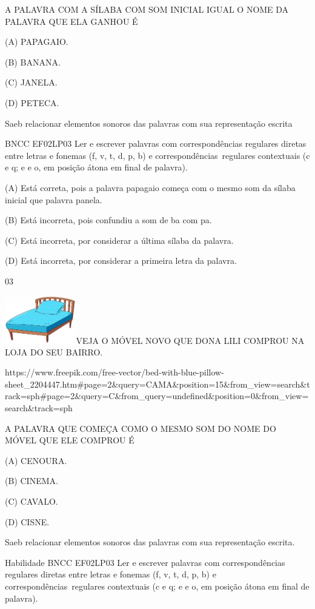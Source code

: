 {{{{{{\protect\hypertarget{_Hlk129268378}{}{}A PALAVRA COM A SÍLABA COM SOM
INICIAL IGUAL O NOME DA PALAVRA QUE ELA GANHOU É

(A) PAPAGAIO.

(B) BANANA.

(C) JANELA.

(D) PETECA.

Saeb relacionar elementos sonoros das palavras com sua representação
escrita

BNCC EF02LP03 Ler e escrever palavras com correspondências regulares
diretas entre letras e fonemas (f, v, t, d, p, b) e
correspondências~regulares contextuais (c e q; e e o, em posição átona
em final de palavra).

(A) Está correta, pois a palavra papagaio começa com o mesmo som da
sílaba inicial que palavra panela.

(B) Está incorreta, pois confundiu a som de ba com pa.

(C) Está incorreta, por considerar a última sílaba da palavra.

(D) Está incorreta, por considerar a primeira letra da palavra.

\num{03}

\includegraphics[width=1.22293in,height=0.81839in]{media/image140.jpeg}VEJA
O MÓVEL NOVO QUE DONA LILI COMPROU NA LOJA DO SEU BAIRRO.

https://www.freepik.com/free-vector/bed-with-blue-pillow-sheet\_2204447.htm\#page=2\&query=CAMA\&position=15\&from\_view=search\&track=sph\#page=2\&query=C\&from\_query=undefined\&position=0\&from\_view=search\&track=sph

\protect\hypertarget{_Hlk129272831}{}{}A PALAVRA QUE COMEÇA COMO O MESMO
SOM DO NOME DO MÓVEL QUE ELE COMPROU É

(A) CENOURA.

(B) CINEMA.

(C) CAVALO.

(D) CISNE.

\protect\hypertarget{_Hlk129152414}{}{\protect\hypertarget{_Hlk129151771}{}{}}Saeb
relacionar elementos sonoros das palavras com sua representação escrita.

Habilidade BNCC EF02LP03 Ler e escrever palavras com correspondências
regulares diretas entre letras e fonemas (f, v, t, d, p, b) e
correspondências~regulares contextuais (c e q; e e o, em posição átona
em final de palavra).

}}}}}}
